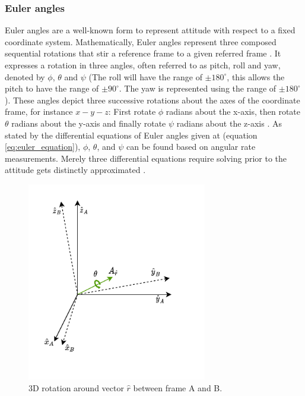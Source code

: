 \subsubsection{Euler angles}

Euler angles are a well-known form to represent attitude with respect to a fixed coordinate system. Mathematically, Euler angles represent three composed sequential rotations that stir a reference frame to a given referred frame \cite{diebel2006representing}. It expresses a rotation in three angles, often referred to as pitch, roll and yaw, denoted by $\phi$, $\theta$ and $\psi$ (The roll will have the range of $\pm180^\circ$, this allows the pitch to have the range of $\pm90^{\circ}$. The yaw is represented using the range of $\pm180^{\circ}$). These angles depict three successive rotations about the axes of the coordinate frame, for instance $x-y-z$: First rotate $\phi$ radians about the x-axis, then rotate $\theta$ radians about the y-axis and finally rotate $\psi$ radians about the z-axis \cite{grado1960solution}. As stated by the differential equations of Euler angles given at (equation \ref{eq:euler_equation}), $\phi$, $\theta$, and $\psi$ can be found based on angular rate measurements. Merely three differential equations require solving prior to the attitude gets distinctly approximated \cite{bar1985attitude}.


\begin{figure}[!h]
    \centering
    \includegraphics[width=0.7\textwidth]{figures/rotation.pdf}
    \caption{ 3D rotation around vector $\hat{r}$ between frame A and B. }
    \label{fig:rotation}
\end{figure}

